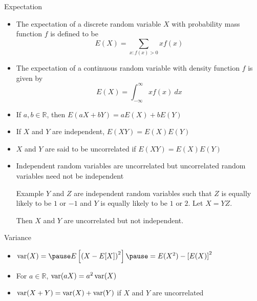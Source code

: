 \documentclass[t]{beamer}
\newcommand{\var}{\operatornamewithlimits{var}}
\begin{document}
\begin{frame}{Expectation}
  \footnotesize
  \begin{itemize}
    \item \pause The expectation of a discrete random variable $X$ with probability mass function $f$ is defined to be
      \begin{equation*}
        E(X) = \sum_{x:f(x) > 0} xf(x)
      \end{equation*}
    \item \pause The expectation of a continuous random variable with density function $f$ is given by
      \begin{equation*}
        E(X) = \int_{-\infty}^\infty x f(x) \ dx
      \end{equation*}
    \item \pause If $a, b \in \mathbb{R}$, then $E(aX + bY) = aE(X) + bE(Y)$
    \item \pause If $X$ and $Y$ are independent, $E(XY) = E(X)E(Y)$
    \item \pause $X$ and $Y$ are said to be uncorrelated if $E(XY) = E(X)E(Y)$
    \item \pause Independent random variables are uncorrelated but uncorrelated random variables need not be independent
      \pause
      \begin{block}{Example}
        $Y$ and $Z$ are independent random variables such that $Z$ is equally likely to be $1$ or $-1$ and $Y$ is equally likely to be $1$ or $2$. \pause Let $X = YZ$. 
        
        \pause Then $X$ and $Y$ are uncorrelated but not independent.
      \end{block}
  \end{itemize}
  \normalsize
\end{frame}

\begin{frame}{Variance}
  \footnotesize
  \begin{itemize}
    \item \pause $\var(X) = \pause E\left[\left(X-E[X]\right)^2\right] \pause = E(X^2) - \left[ E(X)\right]^2$
    \item \pause For $a \in \mathbb{R}$, $\var(aX) = a^2\var(X)$
    \item \pause $\var(X+Y) = \var(X) + \var(Y)$ if \pause $X$ and $Y$ are uncorrelated
  \end{itemize}
  \normalsize
\end{frame}
\end{document}
